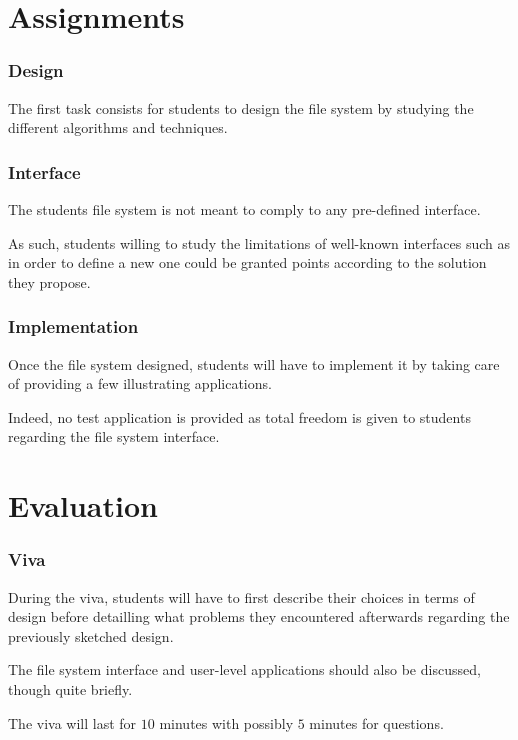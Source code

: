 %
%

\section{Assignments}


\begin{frame}
  \frametitle{Design}

  The first task consists for students to design the file system by studying
  the different algorithms and techniques.
\end{frame}


\begin{frame}
  \frametitle{Interface}

  The students file system is not meant to comply to any pre-defined interface.

  \-

  As such, students willing to study the limitations of well-known interfaces
  such as  in order to define a new one could be granted points
  according to the solution they propose.
\end{frame}


\begin{frame}
  \frametitle{Implementation}

  Once the file system designed, students will have to implement it by
  taking care of providing a few illustrating applications.

  \-

  Indeed, no test application is provided as total freedom is given to
  students regarding the file system interface.
\end{frame}

%
%

\section{Evaluation}


\begin{frame}
  \frametitle{Viva}

  During the viva, students will have to first describe their choices in
  terms of design before detailling what problems they encountered afterwards
  regarding the previously sketched design.

  \-

  The file system interface and user-level applications should also be
  discussed, though quite briefly.

  \-

  The viva will last for $10$ minutes with possibly $5$ minutes for questions.
\end{frame}

